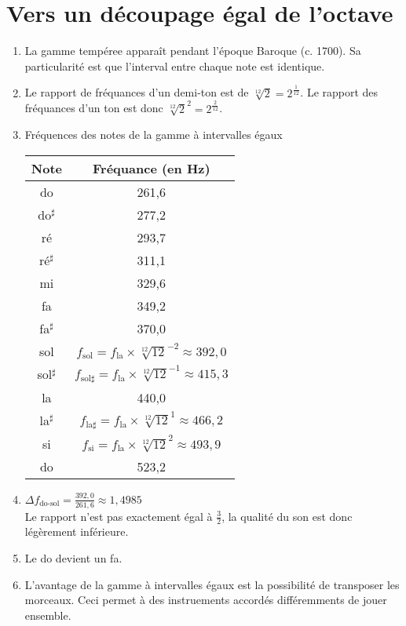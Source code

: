 \documentclass[12pt]{article}
\begin{document}
    \section{Vers un découpage égal de l'octave}
    \begin{enumerate}
        \item La gamme tempéree apparaît pendant l'époque Baroque (c. 1700). Sa particularité est que l'interval entre chaque note est identique.
        \item Le rapport de fréquances d'un demi-ton est de $\sqrt[12]{2}=2^{\frac{1}{12}}$. Le rapport des fréquances d'un ton est donc $\sqrt[12]{2}^2=2^{\frac{2}{12}}$.
        \item Fréquences des notes de la gamme à intervalles égaux
                \begin{longtable}{|c|c|} \hline \endfirsthead
                    \textbf{Note} & \textbf{Fréquance} (en Hz) \\ \hline
                    do            & 261{,}6                    \\ \hline
                    do$^\sharp$   & 277{,}2                    \\ \hline
                    ré            & 293{,}7                    \\ \hline
                    ré$^\sharp$   & 311{,}1                    \\ \hline
                    mi            & 329{,}6                    \\ \hline
                    fa            & 349{,}2                    \\ \hline
                    fa$^\sharp$   & 370{,}0                    \\ \hline
                    sol           &$f_\text{sol}=f_\text{la}\times\sqrt[12]{12}^{-2}\approx 392{,}0$ \\ \hline
                    sol$^\sharp$  & $f_{\text{sol}\sharp}=f_\text{la}\times\sqrt[12]{12}^{-1}\approx 415{,}3$ \\ \hline
                    la            & 440{,}0                    \\ \hline
                    la$^\sharp$   & $f_{\text{la}\sharp}=f_\text{la}\times\sqrt[12]{12}^1\approx 466{,}2$ \\ \hline
                    si            & $f_\text{si}=f_\text{la}\times\sqrt[12]{12}^2\approx 493{,}9$ \\ \hline
                    do            & 523{,}2                    \\ \hline
                \end{longtable}
    \item $\Delta f_\text{do-sol}=\frac{392{,}0}{261{,}6}\approx 1{,}4985$ \\ Le rapport n'est pas exactement égal à $\frac{3}{2}$, la qualité du son est donc légèrement inférieure.
    \item Le do devient un fa.
    \item L'avantage de la gamme à intervalles égaux est la possibilité de transposer les morceaux. Ceci permet à des instruements accordés différemments de jouer ensemble.
    \end{enumerate}
\end{document}
